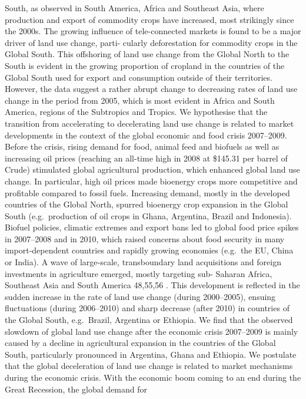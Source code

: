 \documentclass[
]{book}
\begin{document}
South, as observed in South America, Africa and Southeast Asia,
where production and export of commodity crops
have increased, most strikingly since the 2000s.
The growing influence of tele-connected
markets is found to be a major driver of land use change, parti-
cularly deforestation for commodity crops in the Global South.
This offshoring of land use change from the Global North to the
South is evident in the growing proportion of cropland in the
countries of the Global South used for export and consumption
outside of their territories.
However, the data suggest a rather abrupt change to decreasing
rates of land use change in the period from 2005, which is most
evident in Africa and South America, regions of the
Subtropics and Tropics. We
hypothesise that the transition from accelerating to decelerating
land use change is related to market developments in the context
of the global economic and food crisis 2007--2009. Before the
crisis, rising demand for food, animal feed and biofuels as well as
increasing oil prices (reaching an all-time high in 2008 at \$145.31
per barrel of Crude) stimulated global agricultural production,
which enhanced global land use change. In particular, high oil
prices made bioenergy crops more competitive and profitable
compared to fossil fuels. Increasing demand, mostly in the
developed countries of the Global North, spurred bioenergy crop
expansion in the Global South (e.g.~production of oil crops in
Ghana, Argentina, Brazil and Indonesia).
Biofuel policies, climatic extremes and export bans led to
global food price spikes in 2007--2008 and in 2010, which
raised concerns about food security in many import-dependent
countries and rapidly growing economies (e.g.~the EU, China or
India). A wave of large-scale, transboundary land acquisitions and
foreign investments in agriculture emerged, mostly targeting sub-
Saharan Africa, Southeast Asia and South America 48,55,56 . This
development is reflected in the sudden increase in the rate of land
use change (during 2000--2005), ensuing fluctuations (during
2006--2010) and sharp decrease (after 2010) in countries of the
Global South, e.g.~Brazil, Argentina or Ethiopia.
We find that the observed slowdown of global land
use change after the economic crisis 2007--2009 is mainly caused
by a decline in agricultural expansion in the countries of the
Global South, particularly pronounced in Argentina, Ghana and
Ethiopia. We postulate that the global
deceleration of land use change is related to market mechanisms
during the economic crisis. With the economic boom coming to
an end during the Great Recession, the global demand for
\end{document}
